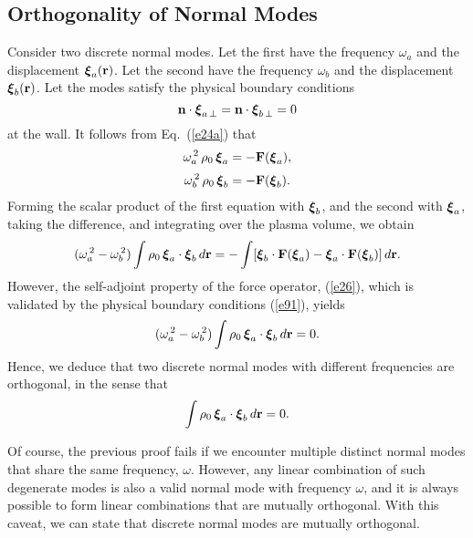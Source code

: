 \documentclass[12pt,prb,aps,notitlepage]{revtex4-1}
\newcommand{\bxi}{\mbox{\boldmath$\xi$}}
\begin{document}
\subsection{Orthogonality of Normal Modes}\label{orth}
Consider two discrete normal modes. Let the first have the frequency $\omega_a$ and the displacement $\bxi_a({\bf r})$. Let the
second have the frequency $\omega_b$ and the displacement $\bxi_b({\bf r})$. Let the modes satisfy the
physical boundary conditions 
\begin{equation}\label{e91}
{\bf n}\cdot\bxi_{a\,\perp}={\bf n}\cdot\bxi_{b\,\perp} = 0
\end{equation}
at the wall. It follows from Eq.~(\ref{e24a}) that
\begin{align}
\omega_a^{\,2}\,\rho_0\,\bxi_a &= -{\bf F}(\bxi_a),\\[0.5ex]
\omega_b^{\,2}\,\rho_0\,\bxi_b &=- {\bf F}(\bxi_b).
\end{align}
Forming the scalar product of the first equation with $\bxi_b$, and the second with $\bxi_a$, taking the difference, and integrating over the
plasma volume, we obtain
\begin{equation}
(\omega_a^{\,2}-\omega_b^{\,2})\int \rho_0\,\bxi_a\cdot\bxi_b\,d{\bf r} = - \int [\bxi_b\cdot {\bf F}(\bxi_a)-\bxi_a\cdot {\bf F}(\bxi_b)]\,d{\bf r}.
\end{equation}
However, the self-adjoint property of the force operator, (\ref{e26}), which is validated by the physical boundary conditions (\ref{e91}), 
yields
\begin{equation}
(\omega_a^{\,2}-\omega_b^{\,2})\int \rho_0\,\bxi_a\cdot\bxi_b\,d{\bf r}=0.
\end{equation}
Hence, we deduce that two discrete normal modes with different frequencies are orthogonal, in the sense that 
\begin{equation}
\int \rho_0\,\bxi_a\cdot\bxi_b\,d{\bf r}=0.
\end{equation}

Of course, the previous proof fails if we encounter multiple  distinct normal modes that share the same frequency, $\omega$. However, any
linear combination of such degenerate modes is also a valid normal mode with frequency $\omega$, and it is always possible to form linear
combinations that are mutually orthogonal. With this caveat, we can state that discrete normal modes are mutually orthogonal. 
\end{document}
